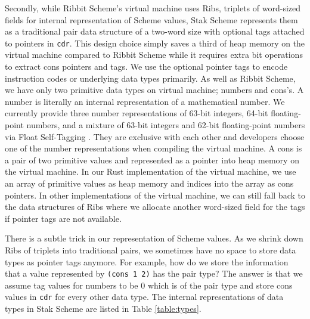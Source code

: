 \documentclass[sigplan]{acmart}
\begin{document}
Secondly, while Ribbit Scheme's virtual machine uses Ribs, triplets of
word-sized fields for internal representation of Scheme values, Stak
Scheme represents them as a traditional pair data structure of a
two-word size with optional tags attached to pointers in \texttt{cdr}.
This design choice simply saves a third of heap memory on the virtual machine
compared to Ribbit Scheme while it requires extra bit operations to
extract cons pointers and tags.
We use the optional pointer tags to encode instruction
codes or underlying data types primarily.
As well as Ribbit Scheme, we have only two primitive data types on virtual
machine; numbers and cons's.
A number is literally an internal representation of a mathematical number.
We currently provide three number
representations of 63-bit integers, 64-bit floating-point numbers,
and a mixture of 63-bit integers and 62-bit floating-point numbers
via Float Self-Tagging \cite{floatselftag}.
They are exclusive with each other and developers choose one
of the number representations when compiling the virtual machine.
A cons is a pair of two primitive values and represented as
a pointer into heap memory on the virtual machine.
In our Rust implementation of the virtual machine, we use an array of
primitive values as heap memory and indices into the array as cons
pointers.
In other implementations of the virtual machine, we can still fall
back to the data structures of Ribs where we allocate another
word-sized field for the tags if pointer tags are not available.

There is a subtle trick in our representation of Scheme values.
As we shrink down Ribs of triplets into traditional pairs, we sometimes
have no space to store data types as pointer tags anymore.
For example, how do we store the information that a value represented
by \texttt{(cons 1 2)} has the pair type?
The answer is that we assume tag values for numbers to be 0 which is of
the pair type
and store cons values in \texttt{cdr} for every other data type.
The internal representations of data types in Stak Scheme are listed
in Table \ref{table:types}.
\end{document}
